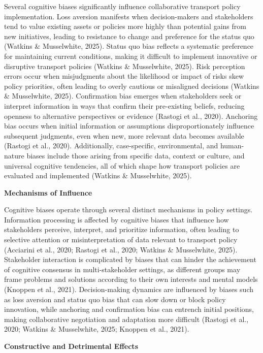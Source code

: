 Several cognitive biases significantly influence collaborative transport policy implementation. Loss aversion manifests when decision-makers and stakeholders tend to value existing assets or policies more highly than potential gains from new initiatives, leading to resistance to change and preference for the status quo (Watkins \& Musselwhite, 2025). Status quo bias reflects a systematic preference for maintaining current conditions, making it difficult to implement innovative or disruptive transport policies (Watkins \& Musselwhite, 2025). Risk perception errors occur when misjudgments about the likelihood or impact of risks skew policy priorities, often leading to overly cautious or misaligned decisions (Watkins \& Musselwhite, 2025). Confirmation bias emerges when stakeholders seek or interpret information in ways that confirm their pre-existing beliefs, reducing openness to alternative perspectives or evidence (Rastogi et al., 2020). Anchoring bias occurs when initial information or assumptions disproportionately influence subsequent judgments, even when new, more relevant data becomes available (Rastogi et al., 2020). Additionally, case-specific, environmental, and human-nature biases include those arising from specific data, context or culture, and universal cognitive tendencies, all of which shape how transport policies are evaluated and implemented (Watkins \& Musselwhite, 2025).

\textbf{Mechanisms of Influence}

Cognitive biases operate through several distinct mechanisms in policy settings. Information processing is affected by cognitive biases that influence how stakeholders perceive, interpret, and prioritize information, often leading to selective attention or misinterpretation of data relevant to transport policy (Acciarini et al., 2020; Rastogi et al., 2020; Watkins \& Musselwhite, 2025). Stakeholder interaction is complicated by biases that can hinder the achievement of cognitive consensus in multi-stakeholder settings, as different groups may frame problems and solutions according to their own interests and mental models (Knoppen et al., 2021). Decision-making dynamics are influenced by biases such as loss aversion and status quo bias that can slow down or block policy innovation, while anchoring and confirmation bias can entrench initial positions, making collaborative negotiation and adaptation more difficult (Rastogi et al., 2020; Watkins \& Musselwhite, 2025; Knoppen et al., 2021).

\textbf{Constructive and Detrimental Effects}

